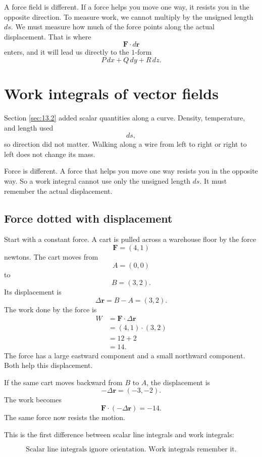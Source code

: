 A force field is different.  If a force helps you move one way, it resists you in the
opposite direction.  To measure work, we cannot multiply by the unsigned length
\(ds\).  We must measure how much of the force points along the actual displacement.
That is where
\[
    \mathbf F\cdot d\mathbf r
\]
enters, and it will lead us directly to the \(1\)-form
\[
    P\,dx+Q\,dy+R\,dz.
\]
\section{Work integrals of vector fields}
\label{sec:13.3}

Section \ref{sec:13.2} added scalar quantities along a curve.  Density, temperature,
and length used
\[
    ds,
\]
so direction did not matter.  Walking along a wire from left to right or right to left
does not change its mass.

Force is different.  A force that helps you move one way resists you in the opposite
way.  So a work integral cannot use only the unsigned length \(ds\).  It must remember
the actual displacement.

\subsection{Force dotted with displacement}

Start with a constant force.  A cart is pulled across a warehouse floor by the force
\[
    \mathbf F=(4,1)
\]
newtons.  The cart moves from
\[
    A=(0,0)
\]
to
\[
    B=(3,2).
\]
Its displacement is
\[
    \Delta \mathbf r=B-A=(3,2).
\]
The work done by the force is
\[
\begin{aligned}
W
&=
\mathbf F\cdot \Delta \mathbf r\\
&=
(4,1)\cdot(3,2)\\
&=
12+2\\
&=
14.
\end{aligned}
\]
The force has a large eastward component and a small northward component.  Both help
this displacement.

If the same cart moves backward from \(B\) to \(A\), the displacement is
\[
    -\Delta \mathbf r=(-3,-2).
\]
The work becomes
\[
    \mathbf F\cdot(-\Delta \mathbf r)=-14.
\]
The same force now resists the motion.

This is the first difference between scalar line integrals and work integrals:

\[
\boxed{
    \text{Scalar line integrals ignore orientation.  Work integrals remember it.}
}
\]


